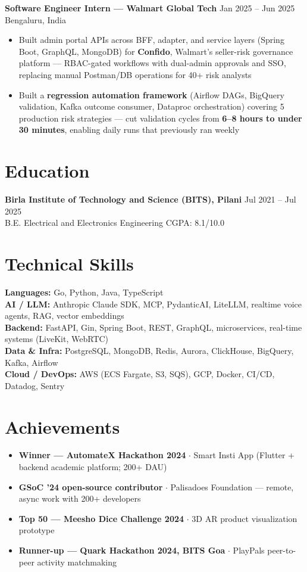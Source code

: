 \documentclass[10pt]{article}
\newcommand{\role}[4]{%
  \textbf{#1 --- #2} \hfill #3\\
  {\small #4}\vspace{-2pt}}
\begin{document}
\role{Software Engineer Intern}{Walmart Global Tech}{Jan 2025 -- Jun 2025}{Bengaluru, India}
\begin{itemize}
  \item Built admin portal APIs across BFF, adapter, and service layers (Spring Boot, GraphQL, MongoDB) for \textbf{Confido}, Walmart's seller-risk governance platform --- RBAC-gated workflows with dual-admin approvals and SSO, replacing manual Postman/DB operations for 40+ risk analysts
  \item Built a \textbf{regression automation framework} (Airflow DAGs, BigQuery validation, Kafka outcome consumer, Dataproc orchestration) covering 5 production risk strategies --- cut validation cycles from \textbf{6--8 hours to under 30 minutes}, enabling daily runs that previously ran weekly
\end{itemize}

\section{Education}
\textbf{Birla Institute of Technology and Science (BITS), Pilani} \hfill Jul 2021 -- Jul 2025\\
B.E. Electrical and Electronics Engineering \hfill CGPA: 8.1/10.0

\section{Technical Skills}
\textbf{Languages:} Go, Python, Java, TypeScript\\
\textbf{AI / LLM:} Anthropic Claude SDK, MCP, PydanticAI, LiteLLM, realtime voice agents, RAG, vector embeddings\\
\textbf{Backend:} FastAPI, Gin, Spring Boot, REST, GraphQL, microservices, real-time systems (LiveKit, WebRTC)\\
\textbf{Data \& Infra:} PostgreSQL, MongoDB, Redis, Aurora, ClickHouse, BigQuery, Kafka, Airflow\\
\textbf{Cloud / DevOps:} AWS (ECS Fargate, S3, SQS), GCP, Docker, CI/CD, Datadog, Sentry

\section{Achievements}
\begin{itemize}
  \item \textbf{Winner --- AutomateX Hackathon 2024} $\cdot$ Smart Insti App (Flutter + backend academic platform; 200+ DAU)
  \item \textbf{GSoC '24 open-source contributor} $\cdot$ Palisadoes Foundation --- remote, async work with 200+ developers
  \item \textbf{Top 50 --- Meesho Dice Challenge 2024} $\cdot$ 3D AR product visualization prototype
  \item \textbf{Runner-up --- Quark Hackathon 2024, BITS Goa} $\cdot$ PlayPals peer-to-peer activity matchmaking
\end{itemize}
\end{document}
